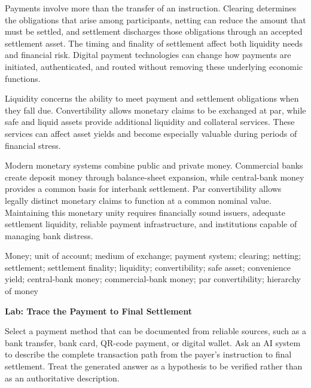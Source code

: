 Payments involve more than the transfer of an instruction. Clearing determines the obligations that arise among participants, netting can reduce the amount that must be settled, and settlement discharges those obligations through an accepted settlement asset. The timing and finality of settlement affect both liquidity needs and financial risk. Digital payment technologies can change how payments are initiated, authenticated, and routed without removing these underlying economic functions.

Liquidity concerns the ability to meet payment and settlement obligations when they fall due. Convertibility allows monetary claims to be exchanged at par, while safe and liquid assets provide additional liquidity and collateral services. These services can affect asset yields and become especially valuable during periods of financial stress.

Modern monetary systems combine public and private money. Commercial banks create deposit money through balance-sheet expansion, while central-bank money provides a common basis for interbank settlement. Par convertibility allows legally distinct monetary claims to function at a common nominal value. Maintaining this monetary unity requires financially sound issuers, adequate settlement liquidity, reliable payment infrastructure, and institutions capable of managing bank distress.



Money; unit of account; medium of exchange; payment system; clearing; netting; settlement; settlement finality; liquidity; convertibility; safe asset; convenience yield; central-bank money; commercial-bank money; par convertibility; hierarchy of money



\textbf{Lab: Trace the Payment to Final Settlement}

Select a payment method that can be documented from reliable sources, such as a bank transfer, bank card, QR-code payment, or digital wallet. Ask an AI system to describe the complete transaction path from the payer's instruction to final settlement. Treat the generated answer as a hypothesis to be verified rather than as an authoritative description.


